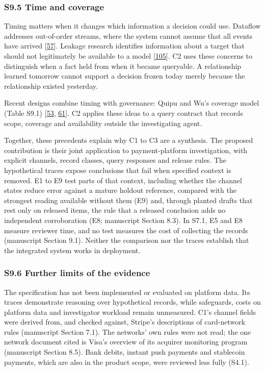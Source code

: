 \documentclass[
  11pt,
]{article}
\begin{document}
\hypertarget{s9.5-time-and-coverage}{%
\subsubsection{S9.5 Time and coverage}\label{s9.5-time-and-coverage}}

Timing matters when it changes which information a decision could use.
Dataflow addresses out-of-order streams, where the system cannot assume
that all events have arrived
{[}\protect\hyperlink{ref-Akidau2015Dataflow}{57}{]}. Leakage research
identifies information about a target that should not legitimately be
available to a model
{[}\protect\hyperlink{ref-Kaufman2011Leakage}{105}{]}. C2 uses these
concerns to distinguish when a fact held from when it became queryable.
A relationship learned tomorrow cannot support a decision frozen today
merely because the relationship existed yesterday.

Recent designs combine timing with governance: Quipu and Wu's coverage
model (Table S9.1)
{[}\protect\hyperlink{ref-Wu2026EvidenceCoverage}{53},
\protect\hyperlink{ref-Brown2026Quipu}{61}{]}. C2 applies these ideas to
a query contract that records scope, coverage and availability outside
the investigating agent.

Together, these precedents explain why C1 to C3 are a synthesis. The
proposed contribution is their joint application to payment-platform
investigation, with explicit channels, record classes, query responses
and release rules. The hypothetical traces expose conclusions that fail
when specified context is removed. E1 to E9 test parts of that context,
including whether the channel states reduce error against a mature
holdout reference, compared with the strongest reading available without
them (E9) and, through planted drafts that rest only on released items,
the rule that a released conclusion adds no independent corroboration
(E8; manuscript Section 8.3). In S7.1, E5 and E8 measure reviewer time,
and no test measures the cost of collecting the records (manuscript
Section 9.1). Neither the comparison nor the traces establish that the
integrated system works in deployment.

\hypertarget{s9.6-further-limits-of-the-evidence}{%
\subsubsection{S9.6 Further limits of the
evidence}\label{s9.6-further-limits-of-the-evidence}}

The specification has not been implemented or evaluated on platform
data. Its traces demonstrate reasoning over hypothetical records, while
safeguards, costs on platform data and investigator workload remain
unmeasured. C1's channel fields were derived from, and checked against,
Stripe's descriptions of card-network rules (manuscript Section 7.1).
The networks' own rules were not read; the one network document cited is
Visa's overview of its acquirer monitoring program (manuscript Section
8.5). Bank debits, instant push payments and stablecoin payments, which
are also in the product scope, were reviewed less fully (S4.1).
\end{document}
